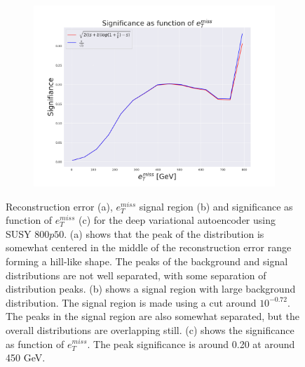 \begin{figure}[h!]
    \begin{subfigure}{.49\textwidth}
        \includegraphics[width=\textwidth]{Figures/VAE_testing/big/2lep/significance_etmiss_800p0p050_-0.7232197345309495.pdf}
        \caption{}
        \label{fig:VAE_2lep_big_signi_800}
    \end{subfigure}
    \hfill      
    \caption[2lep deep network | $800p50$ | VAE]{Reconstruction error (a), $e_T^{miss}$ signal region (b) and significance as function of 
    $e_T^{miss}$ (c) for the deep variational autoencoder using SUSY $800p50$.
    (a) shows that the peak of the distribution is somewhat centered in the middle 
    of the reconstruction error range forming a hill-like shape. The peaks of the background and signal 
    distributions are not well separated, with some separation of distribution peaks. (b) 
    shows a signal region with large background distribution. The signal region is made using a cut around
    $10^{-0.72}$. The peaks in the signal region are also somewhat 
    separated, but the overall distributions are overlapping still. 
    (c) shows the significance as function of $e_T^{miss}$.
The peak significance is around 0.20 at around 450 GeV.}
    \label{fig:VAE_2lep_big_rec_sig_signi_800}
\end{figure}

